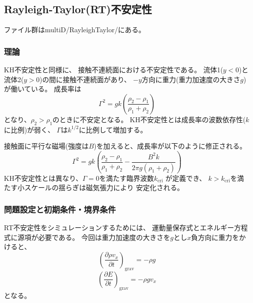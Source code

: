 \clearpage
\subsection{Rayleigh-Taylor(RT)不安定性}
ファイル群は{\ttfamily multiD/RayleighTaylor/}にある。

\subsubsection{理論}

KH不安定性と同様に、
接触不連続面における不安定性である。
流体1($y<0$)と流体2($y>0$)の間に接触不連続面があり、
$-y$方向に重力(重力加速度の大きさ$g$)が働いている。
成長率は
\begin{equation}
\Gamma^2 = g k \left(
\frac{\rho_2 - \rho_1}{\rho_1 + \rho_2}
\right)
\end{equation}
となり、$\rho_2 > \rho_1$のときに不安定となる。
KH不安定性とは成長率の波数依存性($k$に比例)が弱く、
$\Gamma$は$k^{1/2}$に比例して増加する。


接触面に平行な磁場(強度は$B$)を加えると、成長率が以下のように修正される。
\begin{equation}
\Gamma^2 = g k \left(
\frac{\rho_2 - \rho_1}{\rho_1 + \rho_2}
- \frac{B^2 k}{2\pi g (\rho_1 + \rho_2)}
\right)
\end{equation}
KH不安定性とは異なり、$\Gamma=0$を満たす臨界波数$k_\mathrm{cri}$
が定義でき、
$k>k_\mathrm{cri}$を満たす小スケールの揺らぎは磁気張力により
安定化される。

\subsubsection{問題設定と初期条件・境界条件}

RT不安定性をシミュレーションするためには、
運動量保存式とエネルギー方程式に源項が必要である。
今回は重力加速度の大きさを$g$とし$x$負方向に重力をかけると、
\begin{equation}
\left(\frac{\partial \rho v_x}{\partial t}\right)_\mathrm{grav}
= -\rho g
\end{equation}
\begin{equation}
\left(\frac{\partial E}{\partial t}\right)_\mathrm{grav}
= - \rho g v_x
\end{equation}
となる。



